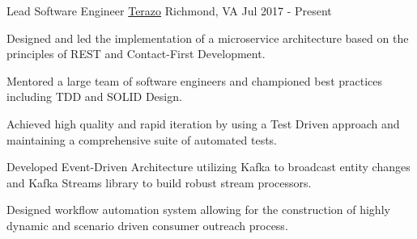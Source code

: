 
\begin{cventries}

  \cventry
  {Lead Software Engineer} %
  {\href{https://terazo.com}{Terazo}} %
  {Richmond, VA} %
  {Jul 2017 - Present} %
  {
    \begin{cvitems} %
      \item {Designed and led the implementation of a microservice architecture
      based on the principles of REST and Contact-First Development.}
      \item {Mentored a large team of software engineers and championed best
      practices including TDD and SOLID Design.}
      \item {Achieved high quality and rapid iteration by using a Test
      Driven approach and maintaining a comprehensive suite of automated tests.}
      \item {Developed Event-Driven Architecture utilizing Kafka to broadcast
      entity changes and Kafka Streams library to build robust stream
      processors.}
      \item {Designed workflow automation system allowing for the construction
      of highly dynamic and scenario driven consumer outreach process.}
    \end{cvitems}
  }


\end{cventries}
